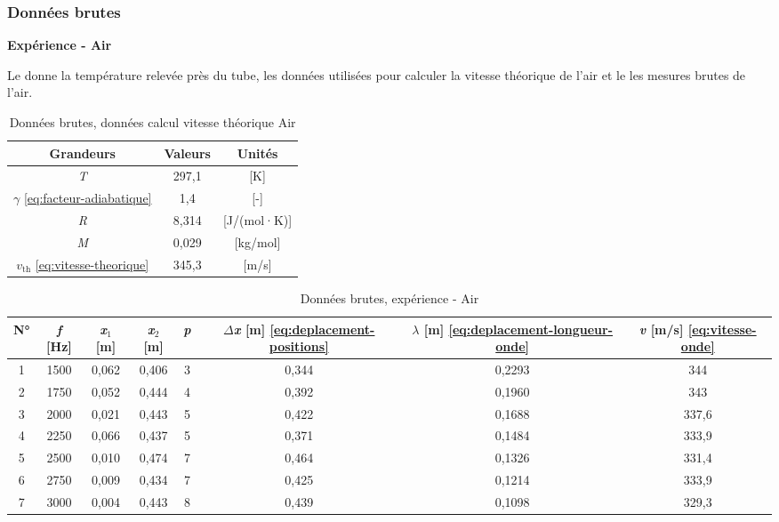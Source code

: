 \subsubsection{Données brutes}

\textbf{Expérience - Air}

Le  donne la température relevée près du tube, les données utilisées pour calculer la vitesse théorique de l'air et le  les mesures brutes de l'air.

\begin{table}[H]
    \centering
    \begin{tabular}{ccc}
        \toprule
        Grandeurs & Valeurs & Unités \\
        \midrule
        \textit{T} & 297,1 & [K] \\
        $\gamma$ \eqref{eq:facteur-adiabatique} & 1,4 & [-] \\
        \textit{R} & 8,314 & [J/(mol·K)] \\
        \textit{M} & 0,029 & [kg/mol] \\
        $v_{\mathrm{th}}$ \eqref{eq:vitesse-theorique} & 345,3 & [m/s] \\
        \bottomrule
    \end{tabular}
    \caption{Données brutes, données calcul vitesse théorique Air}
    \label{tab:temperature-air}
\end{table}

\begin{table}[H]
    \centering
    \small
    \begin{tabular}{cccccccc}
        \toprule
        N° & \textit{f} [Hz] & \textit{x}$_1$ [m] & \textit{x}$_2$ [m] & \textit{p} & $\Delta$\textit{x} [m] \eqref{eq:deplacement-positions} & $\lambda$ [m] \eqref{eq:deplacement-longueur-onde} & \textit{v} [m/s] \eqref{eq:vitesse-onde} \\
        \midrule
        1 & 1500 & 0{,}062 & 0{,}406 & 3 & 0{,}344 & 0{,}2293 & 344 \\
        2 & 1750 & 0{,}052 & 0{,}444 & 4 & 0{,}392 & 0{,}1960 & 343 \\
        3 & 2000 & 0{,}021 & 0{,}443 & 5 & 0{,}422 & 0{,}1688 & 337{,}6 \\
        4 & 2250 & 0{,}066 & 0{,}437 & 5 & 0{,}371 & 0{,}1484 & 333{,}9 \\
        5 & 2500 & 0{,}010 & 0{,}474 & 7 & 0{,}464 & 0{,}1326 & 331{,}4 \\
        6 & 2750 & 0{,}009 & 0{,}434 & 7 & 0{,}425 & 0{,}1214 & 333{,}9 \\
        7 & 3000 & 0{,}004 & 0{,}443 & 8 & 0{,}439 & 0{,}1098 & 329{,}3 \\
        \bottomrule
    \end{tabular}
    \caption{Données brutes, expérience - Air}
    \label{tab:mesures-air}
\end{table}

